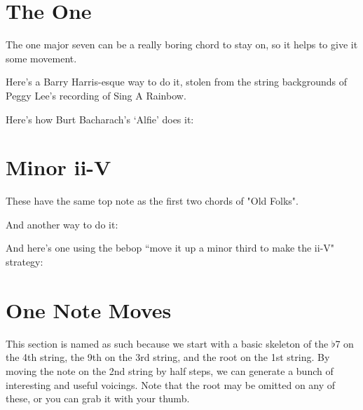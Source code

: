 
\def\numfrets{6}

\section{The One}

The one major seven can be a really boring chord to stay on, so it helps to give it some movement.

Here's a Barry Harris-esque way to do it, stolen from the string backgrounds of Peggy Lee's recording of Sing A Rainbow.


Here's how Burt Bacharach's `Alfie' does it:


\section{Minor ii-V}

These have the same top note as the first two chords of "Old Folks".


And another way to do it:


And here's one using the bebop ``move it up a minor third to make the ii-V" strategy:


\section{One Note Moves}

This section is named as such because we start with a basic skeleton of the $\flat$7 on the 4th string, the 9th on the 3rd string, and the root on the 1st string.  By moving the note on the 2nd string by half steps, we can generate a bunch of interesting and useful voicings.  Note that the root may be omitted on any of these, or you can grab it with your thumb.

